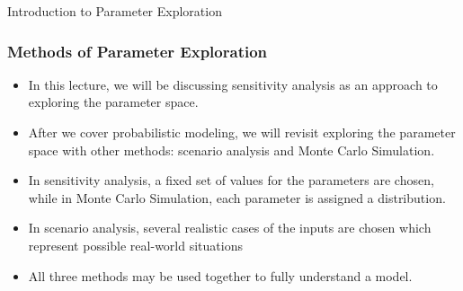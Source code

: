\documentclass[handout, 11pt]{beamer}
\begin{document}
\begin{section}{Introduction to Parameter Exploration}
\begin{frame}
\begin{center}
\begin{adjustbox}{width=0.9\textwidth, height=0.8\textheight, keepaspectratio}
\end{adjustbox}
\end{center}
\end{frame}
\begin{frame}
\frametitle{Methods of Parameter Exploration}
\begin{itemize}
\small
\vfill
\item In this lecture, we will be discussing sensitivity analysis as an approach to exploring the parameter space.
\vfill
\item After we cover probabilistic modeling, we will revisit exploring the parameter space with other methods: scenario analysis and Monte Carlo Simulation.
\vfill
\item In sensitivity analysis, a fixed set of values for the parameters are chosen, while in Monte Carlo Simulation, each parameter is assigned a distribution.
\vfill
\item In scenario analysis, several realistic cases of the inputs are chosen which represent possible real-world situations
\vfill
\item All three methods may be used together to fully understand a model.
\end{itemize}
\end{frame}
\end{section}
\end{document}
